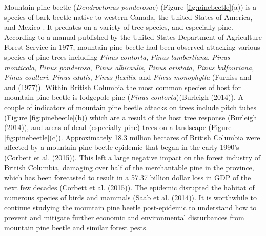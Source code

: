 \documentclass[
  letterpaper,
  DIV=11,
  numbers=noendperiod]{scrreprt}
\begin{document}
Mountain pine beetle (\emph{Dendroctonus ponderosae}) (Figure
\ref{fig:pinebeetle}(a)) is a species of bark beetle native to western
Canada, the United States of America, and Mexico \cite{Furniss1977}. It
predates on a variety of tree species, and especially pine. According to
a manual published by the United States Department of Agriculture Forest
Service in 1977, mountain pine beetle had been observed attacking
various species of pine trees including \emph{Pinus contorta},
\emph{Pinus lambertiana}, \emph{Pinus monticola}, \emph{Pinus
ponderosa}, \emph{Pinus albicaulis}, \emph{Pinus aristata}, \emph{Pinus
balfouriana}, \emph{Pinus coulteri}, \emph{Pinus edulis}, \emph{Pinus
flexilis}, and \emph{Pinus monophylla} (Furniss and and (1977)). Within
British Columbia the most common species of host for mountain pine
beetle is lodgepole pine (\emph{Pinus contorta})(Burleigh (2014)). A
couple of indicators of mountain pine beetle attacks on trees include
pitch tubes (Figure \ref{fig:pinebeetle}(b)) which are a result of the
host tree response (Burleigh (2014)), and areas of dead (especially
pine) trees on a landscape (Figure \ref{fig:pinebeetle}(c)).
Approximately 18.3 million hectares of British Columbia were affected by
a mountain pine beetle epidemic that began in the early 1990's (Corbett
et al. (2015)). This left a large negative impact on the forest industry
of British Columbia, damaging over half of the merchantable pine in the
province, which has been forecasted to result in a 57.37 billion dollar
loss in GDP of the next few decades (Corbett et al. (2015)). The
epidemic disrupted the habitat of numerous species of birds and mammals
(Saab et al. (2014)). It is worthwhile to continue studying the mountain
pine beetle post-epidemic to understand how to prevent and mitigate
further economic and environmental disturbances from mountain pine
beetle and similar forest pests.
\end{document}

